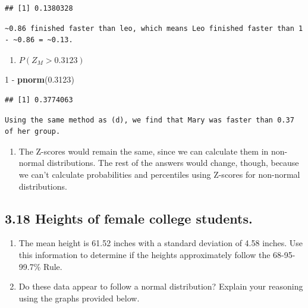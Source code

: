 \documentclass[]{article}
\newenvironment{Shaded}{\begin{snugshade}}{\end{snugshade}}
\newcommand{\KeywordTok}[1]{\textcolor[rgb]{0.13,0.29,0.53}{\textbf{{#1}}}}
\newcommand{\DecValTok}[1]{\textcolor[rgb]{0.00,0.00,0.81}{{#1}}}
\newcommand{\FloatTok}[1]{\textcolor[rgb]{0.00,0.00,0.81}{{#1}}}
\newcommand{\StringTok}[1]{\textcolor[rgb]{0.31,0.60,0.02}{{#1}}}
\newcommand{\NormalTok}[1]{{#1}}
\providecommand{\tightlist}{%
  \setlength{\itemsep}{0pt}\setlength{\parskip}{0pt}}
\begin{document}
\begin{verbatim}
## [1] 0.1380328
\end{verbatim}

\begin{verbatim}
~0.86 finished faster than leo, which means Leo finished faster than 1 - ~0.86 = ~0.13.
\end{verbatim}

\begin{enumerate}
\def\labelenumi{(\alph{enumi})}
\setcounter{enumi}{4}
\tightlist
\item
  \(P(Z_M > 0.3123)\)
\end{enumerate}

\begin{Shaded}
\begin{Highlighting}[]
\DecValTok{1} \NormalTok{-}\StringTok{ }\KeywordTok{pnorm}\NormalTok{(}\FloatTok{0.3123}\NormalTok{)}
\end{Highlighting}
\end{Shaded}

\begin{verbatim}
## [1] 0.3774063
\end{verbatim}

\begin{verbatim}
Using the same method as (d), we find that Mary was faster than 0.37 of her group.
\end{verbatim}

\begin{enumerate}
\def\labelenumi{(\alph{enumi})}
\setcounter{enumi}{5}
\tightlist
\item
  The Z-scores would remain the same, since we can calculate them in
  non-normal distributions. The rest of the answers would change,
  though, because we can't calculate probabilities and percentiles using
  Z-scores for non-normal distributions.
\end{enumerate}

\subsection{3.18 Heights of female college
students.}\label{heights-of-female-college-students.}

\begin{enumerate}
\def\labelenumi{(\alph{enumi})}
\tightlist
\item
  The mean height is 61.52 inches with a standard deviation of 4.58
  inches. Use this information to determine if the heights approximately
  follow the 68-95-99.7\% Rule.
\item
  Do these data appear to follow a normal distribution? Explain your
  reasoning using the graphs provided below.
\end{enumerate}
\end{document}
